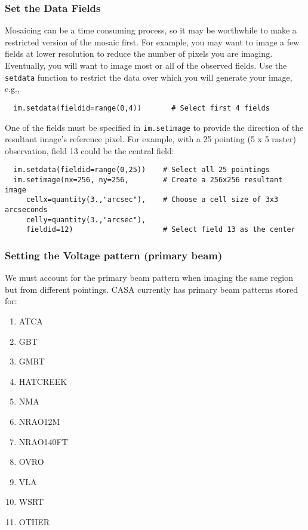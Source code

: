 \subsubsection{Set the Data Fields}
\label{section:imtool.mosaic.set.fields}

Mosaicing can be a time consuming process, so it may be worthwhile to make
a restricted version of the mosaic first.  For example, you may want to
image a few fields at lower resolution to reduce the number of
pixels you are imaging.  Eventually, you will want to image most or all
of the observed fields. Use the {\tt setdata} function to restrict the
data over which you will generate your image, e.g.,

\small
\begin{verbatim}
  im.setdata(fieldid=range(0,4))       # Select first 4 fields
\end{verbatim}
\normalsize

\vspace{3mm}

One of the fields must be specified in {\tt im.setimage} to provide
the direction of the resultant image's reference pixel.  For example,
with a 25 pointing (5 x 5 raster) observation, field 13 could be the
central field:

\small
\begin{verbatim}
  im.setdata(fieldid=range(0,25))    # Select all 25 pointings
  im.setimage(nx=256, ny=256,        # Create a 256x256 resultant image
     cellx=quantity(3.,"arcsec"),    # Choose a cell size of 3x3 arcseconds
     celly=quantity(3.,"arcsec"),
     fieldid=12)                     # Select field 13 as the center
\end{verbatim}
\normalsize

\subsubsection{Setting the Voltage pattern (primary beam)}
\label{section:imtool.mosaic.set.pb}

We must account for the primary beam pattern when imaging the same
region but from different pointings. CASA currently has primary beam patterns stored for:

\begin{enumerate}
   \item ATCA
   \item GBT
   \item GMRT
   \item HATCREEK
   \item NMA
   \item NRAO12M
   \item NRAO140FT
   \item OVRO
   \item VLA
   \item WSRT
   \item OTHER
\end{enumerate}

